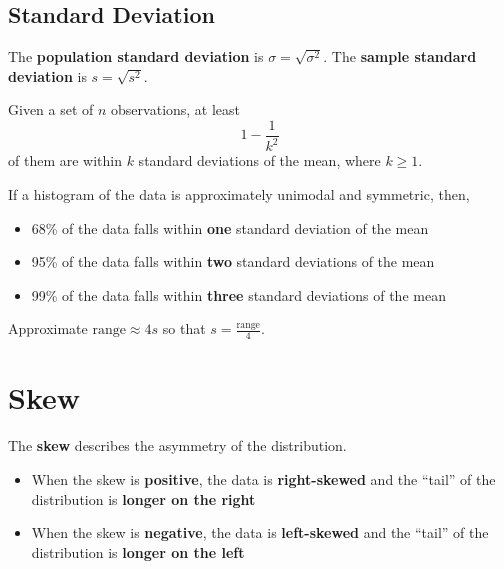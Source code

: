 \documentclass{article}
\begin{document}
\begin{multicols}{3}
\subsection{Standard Deviation}
The \textbf{population standard deviation} is
\(
              \sigma = \sqrt{\sigma^2}.
              \)
The \textbf{sample standard deviation} is
\(
              s = \sqrt{s^2}.
              \)
\begin{theorem}
    Given a set of \(n\) observations, at least
    \begin{equation*}
        1 - \frac{1}{k^2}
    \end{equation*}
    of them are within \(k\) standard deviations of the mean,
    where \(k \geq 1\).
\end{theorem}
\begin{theorem}
    If a histogram of the data is approximately unimodal and symmetric, then,
    \begin{itemize}
        \item 68\% of the data falls within \textbf{one} standard deviation of the mean
        \item 95\% of the data falls within \textbf{two} standard deviations of the mean
        \item 99\% of the data falls within \textbf{three} standard deviations of the mean
    \end{itemize}
\end{theorem}
Approximate
\(
    \text{range} \approx 4 s
    \)
so that
\(
    s = \frac{\text{range}}{4}
    \).
\section{Skew}
The \textbf{skew} describes the asymmetry of the distribution.
\begin{itemize}
    \item When the skew is \textbf{positive}, the data is \textbf{right-skewed} and the ``tail'' of the distribution is \textbf{longer on the right}
    \item When the skew is \textbf{negative}, the data is \textbf{left-skewed} and the ``tail'' of the distribution is \textbf{longer on the left}
\end{itemize}

\end{multicols}
\end{document}
